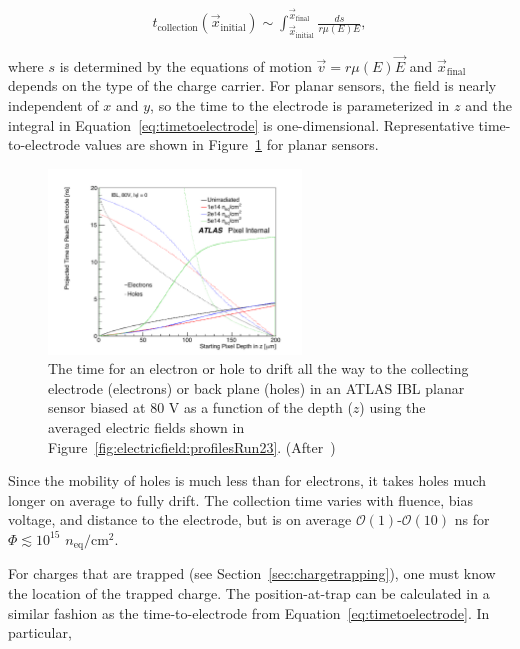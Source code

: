 \begin{align}
\label{eq:timetoelectrode}
t_\text{collection}(\vec{x}_\text{initial})\sim\int_\text{$\vec{x}_\text{initial}$}^\text{$\vec{x}_\text{final}$}\frac{ds}{r\mu(E)E},
\end{align}

where $s$ is determined by the equations of motion $\vec{v}=r\mu(E)\vec{E}$ and $\vec{x}_\text{final}$ 
depends on the type of the charge carrier.  For planar sensors, the field is nearly independent of $x$ and 
$y$, so the time to the electrode is parameterized in $z$ and the integral in 
Equation~\ref{eq:timetoelectrode} is one-dimensional.    Representative time-to-electrode values are 
shown in Figure~\ref{fig:timetoelectrode} for planar  sensors.  


\begin{figure}[!htpb]
\centering
\includegraphics[width=0.6\textwidth]{newtz_0fluence80V.pdf}
\caption{The time for an electron or hole to drift all the way to the collecting electrode (electrons) or back plane (holes) in an ATLAS IBL planar sensor biased at 80 V as a function of the depth ($z$) using the averaged electric fields shown in Figure~\ref{fig:electricfield:profilesRun23}.  (After~\cite{Benoit:2255825})}
\label{fig:timetoelectrode}
\end{figure}

Since the mobility of holes is much less than for electrons, it takes holes much longer on average to fully drift.  The collection time varies with fluence, bias voltage, and distance to the electrode, but is on average $\mathcal{O}(1)$-$\mathcal{O}(10)$ ns for $\Phi\lesssim 10^{15}$ $n_\text{eq}/\text{cm}^2$.





For charges that are trapped (see Section~\ref{sec:chargetrapping}), one must know the location of the trapped charge.  The position-at-trap can be calculated in a similar fashion as the time-to-electrode from Equation~\ref{eq:timetoelectrode}.  In particular, 

